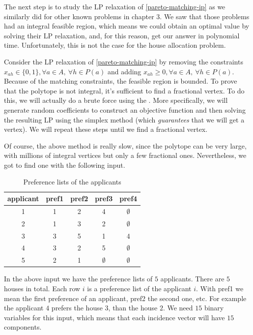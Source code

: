 \documentclass[12pt]{report}
\numberwithin{algorithm}{chapter}
\begin{document}
	The next step is to study the LP relaxation of \eqref{pareto-matching-ip} as we similarly did for other known problems in chapter $3$. We saw that those problems had an integral feasible region, which means we could obtain an optimal value by solving their LP relaxation, and, for this reason, get our answer in polynomial time. Unfortunately, this is not the case for the house allocation problem. 
	
	Consider the LP relaxation of \eqref{pareto-matching-ip} by removing the constraints $x_{ah} \in \{0,1\}, \forall a\in A,\ \forall h\in P(a)$ and adding $x_{ah} \geq 0, \forall a\in A,\ \forall h\in P(a)$. Because of the matching constraints, the feasible region is bounded. To prove that the polytope is not integral, it's sufficient to find a fractional vertex. To do this, we will actually do a brute force using the . More specifically, we will generate random coefficients to construct an objective function and then solving the resulting LP using the simplex method (which \emph{guarantees} that we will get a vertex). We will repeat these steps until we find a fractional vertex. 
	
 	Of course, the above method is really slow, since the polytope can be very large, with millions of integral vertices but only a few fractional ones. Nevertheless, we got to find one with the following input.
 
 	\begin{table}[h]
 		\centering
 		\begin{tabular}{c|cccc}
 			\hline
 			applicant & pref1 & pref2 & pref3 & pref4 \\
 			\hline
 			1 & 1 & 2 & 4 & $\emptyset$ \\
 			2 & 1 & 3 & 2 & $\emptyset$ \\
 			3 & 3 & 5 & 1 & 4 \\
 			4 & 3 & 2 & 5 & $\emptyset$ \\
 			5 & 2 & 1 & $\emptyset$ & $\emptyset$ \\
 			\hline
 		\end{tabular}
 		\caption{Preference lists of the applicants}
 		\label{basic-pom-instance}
 	\end{table}
 	
 	In the above input we have the preference lists of $5$ applicants. There are $5$ houses in total. Each row $i$ is a preference list of the applicant $i$. With pref1 we mean the first preference of an applicant, pref2 the second one, etc. For example the applicant $4$ prefers the house $3$, than the house $2$. We need $15$ binary variables for this input, which means that each incidence vector will have $15$ components. 
 	
\end{document}
